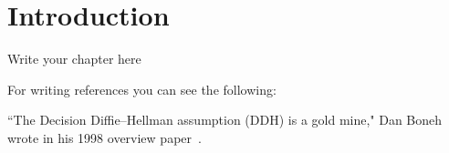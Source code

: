
\chapter{Introduction} 

\label{Chapter1}

Write your chapter here 

\medskip

For writing references you can see the following:

\medskip

``The Decision Diffie–Hellman assumption (DDH) is a gold mine," Dan Boneh wrote in his 1998 
overview paper~\cite{boneh2006decision}.